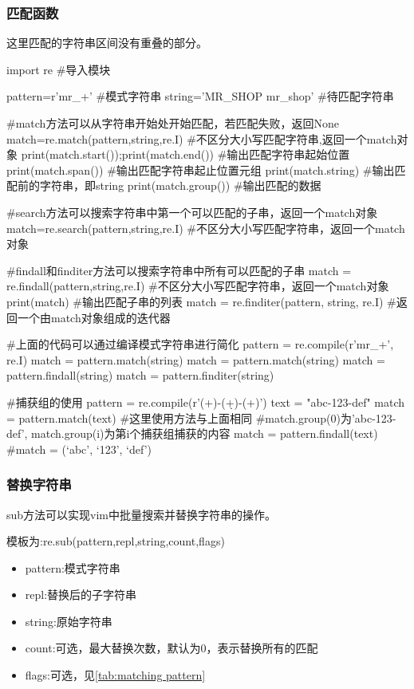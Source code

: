 \documentclass{article}
\begin{document}
      \subsubsection{匹配函数}
        这里匹配的字符串区间没有重叠的部分。
        \begin{codeblock}[language=python, caption={string matching}]
          import re #导入模块

          pattern=r'mr_\w+' #模式字符串
          string='MR_SHOP mr_shop' #待匹配字符串

          #match方法可以从字符串开始处开始匹配，若匹配失败，返回None
          match=re.match(pattern,string,re.I) #不区分大小写匹配字符串,返回一个match对象
          print(match.start());print(match.end()) #输出匹配字符串起始位置
          print(match.span()) #输出匹配字符串起止位置元组
          print(match.string) #输出匹配前的字符串，即string
          print(match.group()) #输出匹配的数据

          #search方法可以搜索字符串中第一个可以匹配的子串，返回一个match对象
          match=re.search(pattern,string,re.I) #不区分大小写匹配字符串，返回一个match对象

          #findall和finditer方法可以搜索字符串中所有可以匹配的子串
          match = re.findall(pattern,string,re.I) #不区分大小写匹配字符串，返回一个match对象
          print(match) #输出匹配子串的列表
          match = re.finditer(pattern, string, re.I) #返回一个由match对象组成的迭代器

          #上面的代码可以通过编译模式字符串进行简化
          pattern = re.compile(r'mr_\w+', re.I)
          match = pattern.match(string)
          match = pattern.match(string)
          match = pattern.findall(string)
          match = pattern.finditer(string)

          #捕获组的使用
          pattern = re.compile(r'(\w+)-(\d+)-(\w+)')
          text = "abc-123-def"
          match = pattern.match(text) #这里使用方法与上面相同
          #match.group(0)为'abc-123-def', match.group(i)为第i个捕获组捕获的内容
          match = pattern.findall(text) #match = \lbrack(`abc', `123', `def')\rbrack
        \end{codeblock}

      \subsubsection{替换字符串}
        sub方法可以实现vim中批量搜索并替换字符串的操作。

        模板为:re.sub(pattern,repl,string,count,flags)
        \begin{itemize}
          \item pattern:模式字符串
          \item repl:替换后的子字符串
          \item string:原始字符串
          \item count:可选，最大替换次数，默认为0，表示替换所有的匹配
          \item flags:可选，见\autoref{tab:matching pattern}
        \end{itemize}
\end{document}
